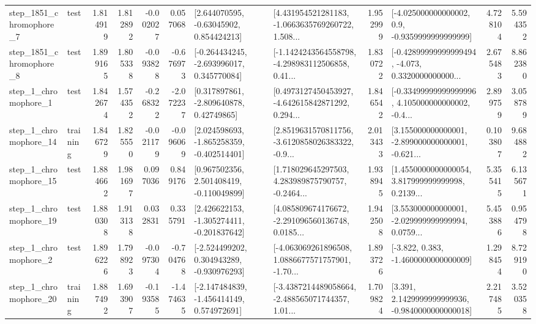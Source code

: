 \begin{tabular}{llrrrrllrlrr}
  step\_1851\_chromophore\_7 &      test &      1.814919 &    1.812892 &     -0.002027 &  0.057068 &     [2.644070595, -0.63045902, 0.854424213] &  [4.431954521281183, -1.0663635769260722, 1.508... &       1.952999 &     [-4.025000000000002, 0.9, -0.9359999999999999] &            4.728104 &          5.594352 \\
  step\_1851\_chromophore\_8 &      test &      1.899165 &    1.805338 &     -0.093828 & -0.676973 &   [-0.264434245, -2.693996017, 0.345770084] &  [-1.1424243564558798, -4.298983112506858, 0.41... &       1.830722 &  [-0.42899999999999494, -4.073, 0.3320000000000... &            2.675483 &          8.862380 \\
     step\_1\_chromophore\_1 &      test &      1.842674 &    1.574352 &     -0.268322 & -2.072237 &     [0.317897861, -2.809640878, 0.42749865] &  [0.4973127450453927, -4.642615842871292, 0.294... &       1.846542 &  [-0.33499999999999996, 4.105000000000002, -0.4... &            2.899759 &          3.058789 \\
    step\_1\_chromophore\_14 &  training &      1.846729 &    1.825550 &     -0.021179 & -0.096069 &   [2.024598693, -1.865258359, -0.402514401] &  [2.8519631570811756, -3.6120858026383322, -0.9... &       2.013433 &  [3.155000000000001, -2.899000000000001, -0.621... &            0.103807 &          9.684882 \\
    step\_1\_chromophore\_15 &      test &      1.884662 &    1.981697 &      0.097036 &  0.849176 &    [0.967502356, 2.501408419, -0.110049899] &  [1.718029645297503, 4.283989875790757, -0.2464... &       1.938945 &  [1.4550000000000054, 3.817999999999998, 0.2139... &            5.355415 &          6.135671 \\
    step\_1\_chromophore\_19 &      test &      1.880308 &    1.913138 &      0.032831 &  0.335791 &   [2.426622153, -1.305274411, -0.201837642] &  [4.085809674176672, -2.291096560136748, 0.0185... &       1.942508 &  [3.553000000000001, -2.029999999999994, 0.0759... &            5.453886 &          0.954798 \\
     step\_1\_chromophore\_2 &      test &      1.896226 &    1.798923 &     -0.097304 & -0.704768 &   [-2.524499202, 0.304943289, -0.930976293] &  [-4.063069261896508, 1.0886677571757901, -1.70... &       1.893726 &               [-3.822, 0.383, -1.4600000000000009] &            1.298454 &          8.729190 \\
    step\_1\_chromophore\_20 &  training &      1.887492 &    1.693907 &     -0.193585 & -1.474635 &   [-2.147484839, -1.456414149, 0.574972691] &  [-3.4387214489058664, -2.488565071744357, 1.01... &       1.709824 &   [3.391, 2.1429999999999936, -0.9840000000000018] &            2.217485 &          3.520358 \\

\end{tabular}

